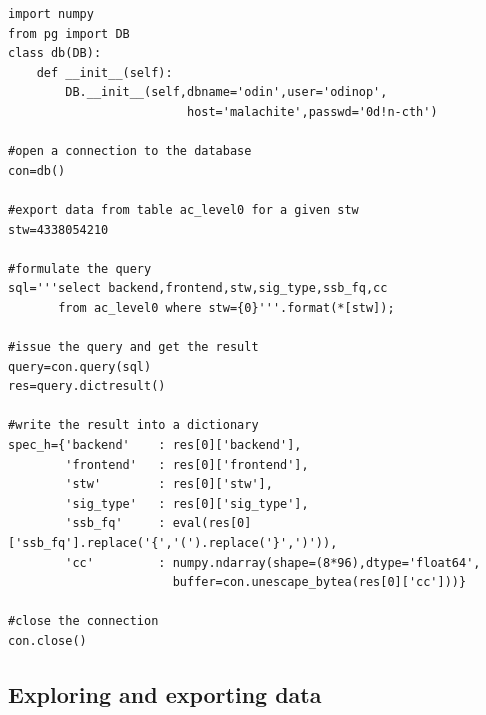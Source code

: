 \documentclass[12pt]{article}
\begin{document}
\begin{verbatim}
import numpy
from pg import DB
class db(DB):
    def __init__(self):
        DB.__init__(self,dbname='odin',user='odinop',
                         host='malachite',passwd='0d!n-cth')

#open a connection to the database
con=db()

#export data from table ac_level0 for a given stw
stw=4338054210

#formulate the query
sql='''select backend,frontend,stw,sig_type,ssb_fq,cc
       from ac_level0 where stw={0}'''.format(*[stw]);

#issue the query and get the result
query=con.query(sql)
res=query.dictresult()

#write the result into a dictionary
spec_h={'backend'    : res[0]['backend'],
        'frontend'   : res[0]['frontend'],
        'stw'        : res[0]['stw'],
        'sig_type'   : res[0]['sig_type'],
        'ssb_fq'     : eval(res[0]['ssb_fq'].replace('{','(').replace('}',')')),
        'cc'         : numpy.ndarray(shape=(8*96),dtype='float64',
                       buffer=con.unescape_bytea(res[0]['cc']))}

#close the connection
con.close()

\end{verbatim}   



\subsection{Exploring and exporting data}
\end{document}
